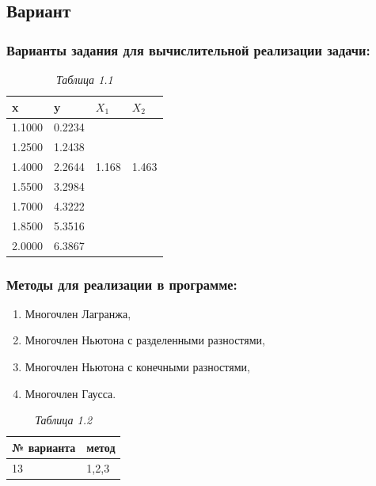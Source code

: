 \documentclass{article}
\begin{document}
\subsection{Вариант}
      \subsubsection{Варианты задания для вычислительной реализации задачи:}
            \begin{table}[H]
                  \begin{tabular}{|l|l|l|l|}
                        \hline
                        x      & y      & $X_1$  & $X_2$  \\ \hline
                        1.1000 & 0.2234 &  & \\ \hline
                        1.2500 & 1.2438 &  & \\ \hline
                        1.4000 & 2.2644 & 1.168 & 1.463 \\ \hline
                        1.5500 & 3.2984 & & \\ \hline
                        1.7000 & 4.3222 & & \\ \hline
                        1.8500 & 5.3516 & & \\ \hline
                        2.0000 & 6.3867 & & \\ \hline
                  \end{tabular}
                  \caption{\small \sl {Таблица 1.1}} 
            \end{table}
      \subsubsection{Методы для реализации в программе:}
            \begin{enumerate}
                  \item Многочлен Лагранжа,
                  \item Многочлен Ньютона с разделенными разностями,
                  \item Многочлен Ньютона с конечными разностями,
                  \item Многочлен Гаусса.
            \end{enumerate}
            \begin{table}[H]
                  \begin{tabular}{|l|l|}
                        \hline
                        № варианта & метод \\ \hline
                        13 & 1,2,3 \\ \hline
                  \end{tabular}
                  \caption{\small \sl {Таблица 1.2}} 
            \end{table}
\end{document}
